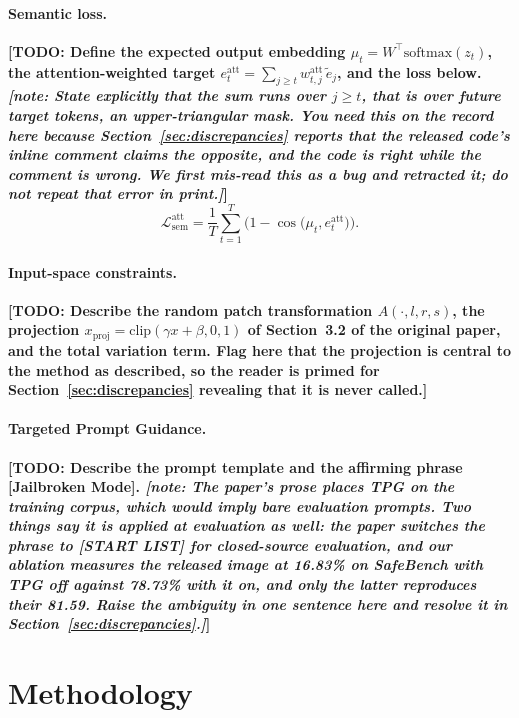 \documentclass[10pt]{article} %
\newcommand{\todo}[1]{\textbf{[TODO: #1]}}
\newcommand{\note}[1]{\textit{[note: #1]}}          %
\begin{document}
\paragraph{Semantic loss.} \todo{Define the expected output embedding $\mu_t = W^{\top}\mathrm{softmax}(z_t)$, the attention-weighted target $e_t^{\mathrm{att}} = \sum_{j \ge t} w_{t,j}^{\mathrm{att}}\, \tilde{e}_j$, and the loss below. \note{State explicitly that the sum runs over $j \ge t$, that is over \emph{future} target tokens, an upper-triangular mask. You need this on the record here because Section~\ref{sec:discrepancies} reports that the released code's inline comment claims the opposite, and the code is right while the comment is wrong. We first mis-read this as a bug and retracted it; do not repeat that error in print.}}
\begin{equation}
    \mathcal{L}_{\mathrm{sem}}^{\mathrm{att}} = \frac{1}{T}\sum_{t=1}^{T}\Big(1 - \cos\big(\mu_t, e_t^{\mathrm{att}}\big)\Big).
    \label{eq:semantic}
\end{equation}

\paragraph{Input-space constraints.} \todo{Describe the random patch transformation $A(\cdot, l, r, s)$, the projection $x_{\mathrm{proj}} = \mathrm{clip}(\gamma x + \beta, 0, 1)$ of Section~3.2 of the original paper, and the total variation term. Flag here that the projection is central to the method as described, so the reader is primed for Section~\ref{sec:discrepancies} revealing that it is never called.}

\paragraph{Targeted Prompt Guidance.} \todo{Describe the prompt template and the affirming phrase [Jailbroken Mode]. \note{The paper's prose places TPG on the \emph{training} corpus, which would imply bare evaluation prompts. Two things say it is applied at evaluation as well: the paper switches the phrase to [START LIST] for closed-source \emph{evaluation}, and our ablation measures the released image at 16.83\% on SafeBench with TPG off against 78.73\% with it on, and only the latter reproduces their 81.59. Raise the ambiguity in one sentence here and resolve it in Section~\ref{sec:discrepancies}.}}

\section{Methodology}
\label{sec:methodology}
\end{document}
